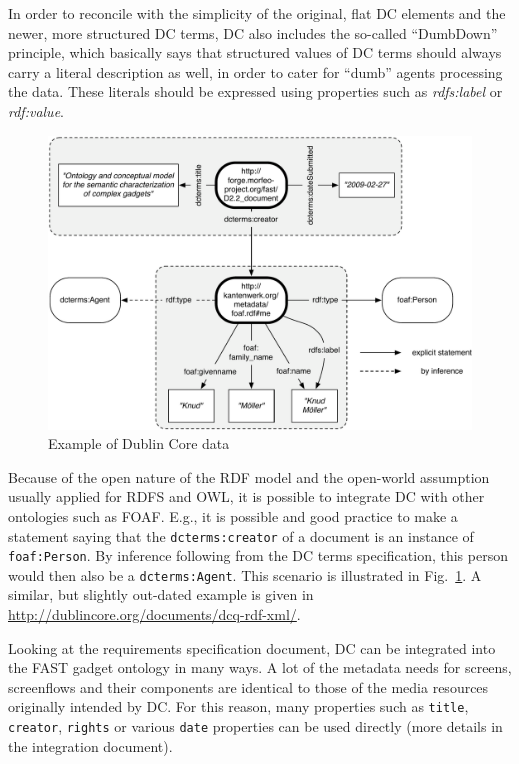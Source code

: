 \documentclass{article}
\begin{document}
In order to reconcile with the simplicity of the original, flat DC elements and the newer, more structured DC terms, DC also includes the so-called ``DumbDown'' principle, which basically says that structured values of DC terms should always carry a literal description as well, in order to cater for ``dumb'' agents processing the data. These literals should be expressed using properties such as \emph{rdfs:label} or \emph{rdf:value}.

\begin{figure}
  \begin{center}
    \includegraphics[width=\linewidth]{images/dcterms_example.pdf}
    \caption{Example of Dublin Core data}
    \label{fig:dcterms_example}
  \end{center}
\end{figure}

Because of the open nature of the RDF model and the open-world assumption usually applied for RDFS and OWL, it is possible to integrate DC with other ontologies such as FOAF. E.g., it is possible and good practice to make a statement saying that the \texttt{dcterms:creator} of a document is an instance of \texttt{foaf:Person}. By inference following from the DC terms specification, this person would then also be a \texttt{dcterms:Agent}. This scenario is illustrated in Fig.~\ref{fig:dcterms_example}. A similar, but slightly out-dated example is given in \url{http://dublincore.org/documents/dcq-rdf-xml/}.

Looking at the requirements specification document, DC can be integrated into the FAST gadget ontology in many ways. A lot of the metadata needs for screens, screenflows and their components are identical to those of the media resources originally intended by DC. For this reason, many properties such as \texttt{title}, \texttt{creator}, \texttt{rights} or various \texttt{date} properties can be used directly (more details in the integration document). 
\end{document}
